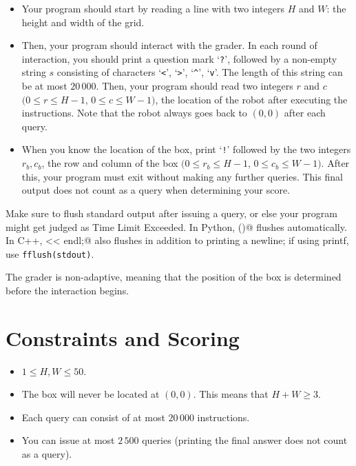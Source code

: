 \begin{itemize}

  \item
Your program should start by reading a line with two integers $H$ and $W$: the height and width of the grid.

  \item
Then, your program should interact with the grader. 
In each round of interaction, you should print a question mark `\verb!?!', followed by a non-empty string $s$ 
consisting of characters `\verb!<!', `\verb!>!', `\verb!^!', `\verb!v!'. 
The length of this string can be at most $20\,000$. 
Then, your program should read two integers $r$ and $c$ $(0 \leq r \leq H-1$, $0 \leq c \leq W-1)$, the location of the robot after executing the instructions. 
Note that the robot always goes back to $(0,0)$ after each query.

  \item
When you know the location of the box, print `\verb|!|' followed by the two integers $r_b, c_b$, the row and column of the box $(0\le r_b \le H-1$, $0\le c_b \le W-1)$. After this, your program must exit without making any further queries. This final output does not count as a query when determining your score.
\end{itemize}


Make sure to flush standard output after issuing a query, or else your program might get judged as Time Limit Exceeded.
In Python, \verb@print()@ flushes automatically. In C++, \verb@cout << endl;@ also flushes in addition to printing a newline; if using printf, use \texttt{fflush(stdout)}.

The grader is non-adaptive, meaning that the position of the box is determined before the interaction begins.

\section*{Constraints and Scoring}
\begin{itemize}
  \item  $1 \leq H,W \leq 50$.
  \item The box will never be located at $(0, 0)$. This means that $H+W \geq 3$.
  \item Each query can consist of at most $20\,000$ instructions.
  \item You can issue at most $2\,500$ queries (printing the final answer does not count as a query).
\end{itemize}

